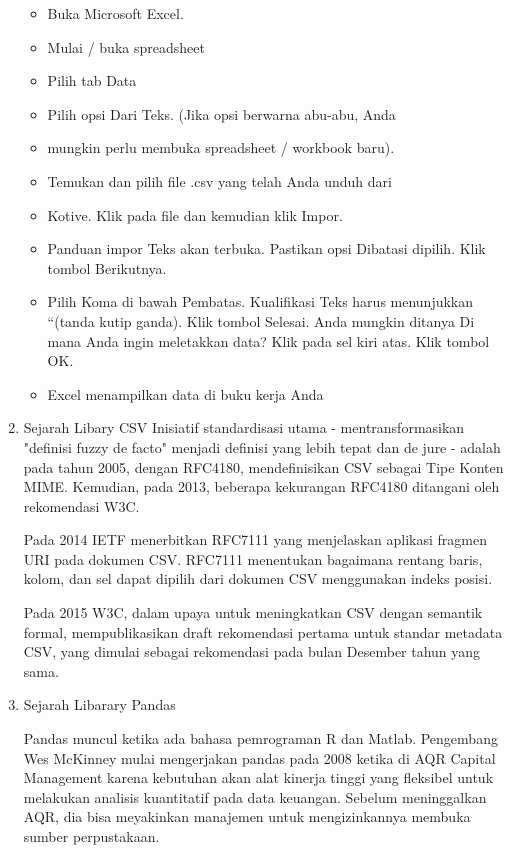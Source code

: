 \begin{enumerate}
\begin{itemize}
\item Buka Microsoft Excel.
\item Mulai / buka spreadsheet 
\item Pilih tab Data 
\item Pilih opsi Dari Teks. (Jika opsi berwarna abu-abu, Anda \item mungkin perlu membuka spreadsheet / workbook baru).
\item Temukan dan pilih file .csv yang telah Anda unduh dari \item Kotive. Klik pada file dan kemudian klik Impor.
\item Panduan impor Teks akan terbuka. Pastikan opsi Dibatasi  dipilih. Klik tombol Berikutnya.
\item Pilih Koma di bawah Pembatas. Kualifikasi Teks harus menunjukkan “(tanda kutip ganda). Klik tombol Selesai.
Anda mungkin ditanya Di mana Anda ingin meletakkan data? Klik pada sel kiri atas. Klik tombol OK.
\item Excel menampilkan data di buku kerja Anda
\end{itemize}



\item Sejarah Libary CSV
Inisiatif standardisasi utama - mentransformasikan "definisi fuzzy de facto" menjadi definisi yang lebih tepat dan de jure - adalah pada tahun 2005, dengan RFC4180, mendefinisikan CSV sebagai Tipe Konten MIME. Kemudian, pada 2013, beberapa kekurangan RFC4180 ditangani oleh rekomendasi W3C.

Pada 2014 IETF menerbitkan RFC7111 yang menjelaskan aplikasi fragmen URI pada dokumen CSV. RFC7111 menentukan bagaimana rentang baris, kolom, dan sel dapat dipilih dari dokumen CSV menggunakan indeks posisi.

Pada 2015 W3C, dalam upaya untuk meningkatkan CSV dengan semantik formal, mempublikasikan draft rekomendasi pertama untuk standar metadata CSV, yang dimulai sebagai rekomendasi pada bulan Desember tahun yang sama.

\item Sejarah Libarary Pandas

Pandas muncul ketika ada bahasa pemrograman R dan Matlab.
Pengembang Wes McKinney mulai mengerjakan pandas pada 2008 ketika di AQR Capital Management karena kebutuhan akan alat kinerja tinggi yang fleksibel untuk melakukan analisis kuantitatif pada data keuangan. Sebelum meninggalkan AQR, dia bisa meyakinkan manajemen untuk mengizinkannya membuka sumber perpustakaan.


\end{enumerate}
